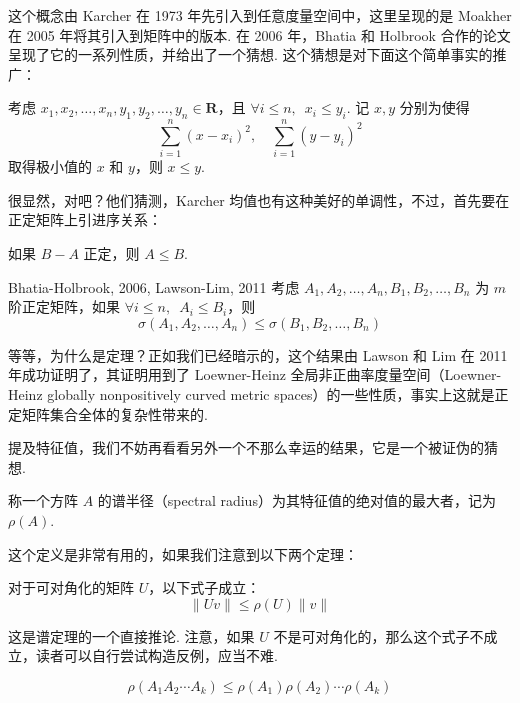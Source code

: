 这个概念由 Karcher 在 1973 年先引入到任意度量空间中，这里呈现的是 Moakher 在 2005 年将其引入到矩阵中的版本. 在 2006 年，Bhatia 和 Holbrook 合作的论文呈现了它的一系列性质，并给出了一个猜想. 这个猜想是对下面这个简单事实的推广：

\begin{lemma}{}{}
    考虑 $x_1, x_2, \ldots, x_n, y_1, y_2, \ldots, y_n \in \mathbf{R}$，且 $\forall i \leqslant n,\enspace x_i \leqslant y_i$. 记 $x, y$ 分别为使得
    \[ \sum_{i = 1}^n (x - x_i)^2, \quad \sum_{i = 1}^n (y - y_i)^2 \]
    取得极小值的 $x$ 和 $y$，则 $x \leqslant y$.
\end{lemma}

很显然，对吧？他们猜测，Karcher 均值也有这种美好的单调性，不过，首先要在正定矩阵上引进序关系：

\begin{definition}{}{}
    如果 $B - A$ 正定，则 $A \leqslant B$.
\end{definition}

\begin{theorem}{Bhatia-Holbrook, 2006, Lawson-Lim, 2011}{}
    考虑 $A_1, A_2, \ldots, A_n, B_1, B_2, \ldots, B_n$ 为 $m$ 阶正定矩阵，如果 $\forall i \leqslant n,\enspace A_i \leqslant B_i$，则
    \[ \sigma(A_1, A_2, \ldots, A_n) \leqslant \sigma(B_1, B_2, \ldots, B_n) \]
\end{theorem}

等等，为什么是定理？正如我们已经暗示的，这个结果由 Lawson 和 Lim 在 2011 年成功证明了，其证明用到了 Loewner-Heinz 全局非正曲率度量空间（Loewner-Heinz globally nonpositively curved metric spaces）的一些性质，事实上这就是正定矩阵集合全体的复杂性带来的.

提及特征值，我们不妨再看看另外一个不那么幸运的结果，它是一个被证伪的猜想.

\begin{definition}{}{}
    称一个方阵 $A$ 的谱半径（spectral radius）为其特征值的绝对值的最大者，记为 $\rho(A)$.
\end{definition}

这个定义是非常有用的，如果我们注意到以下两个定理：

\begin{theorem}{}{}
    对于可对角化的矩阵 $U$，以下式子成立：
    \[ \lVert Uv \rVert \leqslant \rho(U) \lVert v \rVert \]
\end{theorem}

这是谱定理的一个直接推论. 注意，如果 $U$ 不是可对角化的，那么这个式子不成立，读者可以自行尝试构造反例，应当不难.

\begin{theorem}{}{}
    \[ \rho(A_1A_2\cdots A_k) \leqslant \rho(A_1)\rho(A_2)\cdots \rho(A_k) \]
\end{theorem}

